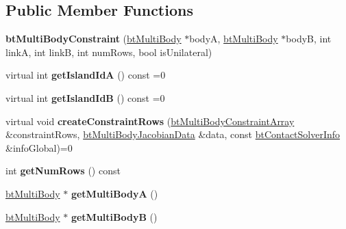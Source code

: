 \subsection*{Public Member Functions}
\begin{DoxyCompactItemize}
\item 
\mbox{\label{classbtMultiBodyConstraint_aab943d7ae4486ecac8029f984d955894}} 
{\bfseries bt\+Multi\+Body\+Constraint} (\hyperlink{classbtMultiBody}{bt\+Multi\+Body} $\ast$bodyA, \hyperlink{classbtMultiBody}{bt\+Multi\+Body} $\ast$bodyB, int linkA, int linkB, int num\+Rows, bool is\+Unilateral)
\item 
\mbox{\label{classbtMultiBodyConstraint_a1e78beb29c2694257d6ca681cea2cfda}} 
virtual int {\bfseries get\+Island\+IdA} () const =0
\item 
\mbox{\label{classbtMultiBodyConstraint_ab305c7ace79332a44134319a9816022a}} 
virtual int {\bfseries get\+Island\+IdB} () const =0
\item 
\mbox{\label{classbtMultiBodyConstraint_a9c20d0b45e909da415345c48cbd99ffa}} 
virtual void {\bfseries create\+Constraint\+Rows} (\hyperlink{classbtAlignedObjectArray}{bt\+Multi\+Body\+Constraint\+Array} \&constraint\+Rows, \hyperlink{structbtMultiBodyJacobianData}{bt\+Multi\+Body\+Jacobian\+Data} \&data, const \hyperlink{structbtContactSolverInfo}{bt\+Contact\+Solver\+Info} \&info\+Global)=0
\item 
\mbox{\label{classbtMultiBodyConstraint_af43b801cb4cd065b987847b59c9f7e1e}} 
int {\bfseries get\+Num\+Rows} () const
\item 
\mbox{\label{classbtMultiBodyConstraint_a61afd0786777b6f4517d2e45e5c1659c}} 
\hyperlink{classbtMultiBody}{bt\+Multi\+Body} $\ast$ {\bfseries get\+Multi\+BodyA} ()
\item 
\mbox{\label{classbtMultiBodyConstraint_a7a5751526a00b81ddfb1b664d8b7f61b}} 
\hyperlink{classbtMultiBody}{bt\+Multi\+Body} $\ast$ {\bfseries get\+Multi\+BodyB} ()
\item 
\mbox{\label{classbtMultiBodyConstraint_a13249f1137e6f00948215807cbbd3f3d}} 

\end{DoxyCompactItemize}
